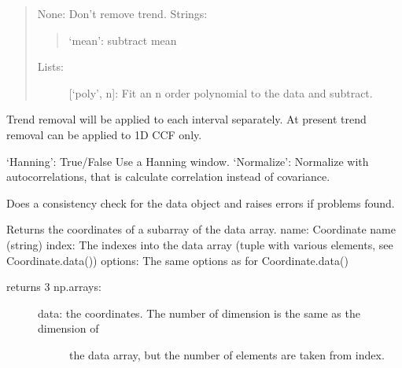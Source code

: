 \documentclass[letterpaper,10pt,english]{sphinxmanual}
\begin{document}
\begin{fulllineitems}
\begin{fulllineitems}
\begin{description}
\begin{description}
\begin{description}
\begin{quote}
None: Don’t remove trend.
Strings:
\begin{quote}

‘mean’: subtract mean
\end{quote}
\begin{description}
\item[{Lists:}] \leavevmode
{[}‘poly’, n{]}: Fit an n order polynomial to the data and subtract.

\end{description}
\end{quote}

Trend removal will be applied to each interval separately.
At present trend removal can be applied to 1D CCF only.

\end{description}

‘Hanning’: True/False Use a Hanning window.
‘Normalize’: Normalize with autocorrelations, that is calculate correlation instead of covariance.

\end{description}

\end{description}

\end{fulllineitems}


\begin{fulllineitems}
\label{\detokenize{data_object:flap.data_object.DataObject.check}}
Does a consistency check for the data object and raises errors if problems found.

\end{fulllineitems}


\begin{fulllineitems}
\label{\detokenize{data_object:flap.data_object.DataObject.coordinate}}
Returns the coordinates of a subarray of the data array.
name: Coordinate name (string)
index: The indexes into the data array (tuple with various elements, see Coordinate.data())
options: The same options as for Coordinate.data()
\begin{description}
\item[{returns 3 np.arrays:}] \leavevmode\begin{description}
\item[{data: the coordinates. The number of dimension is the same as the dimension of}] \leavevmode
the data array, but the number  of elements are taken from index.


\end{description}
\end{description}
\end{fulllineitems}
\end{fulllineitems}
\end{document}
